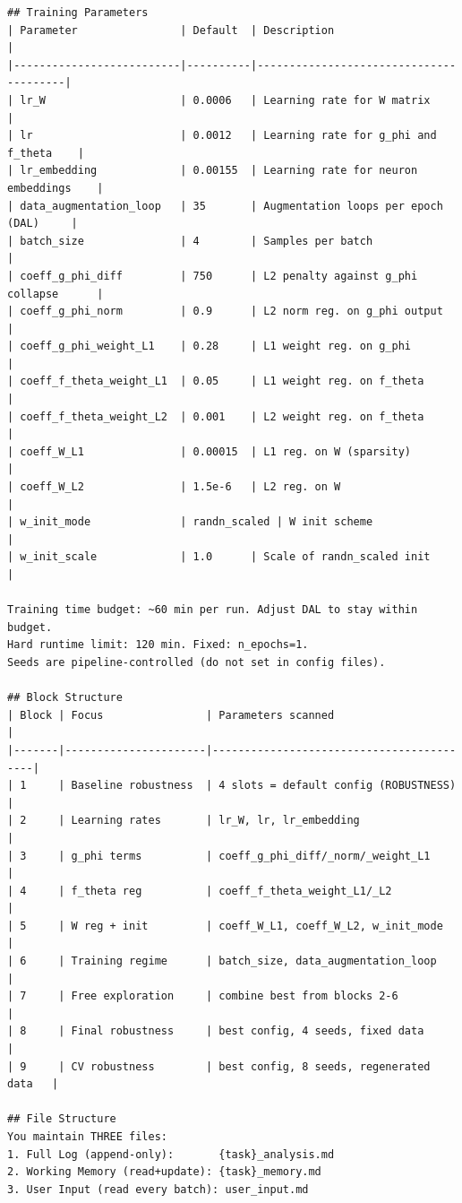 \documentclass{article}
\begin{document}
\begin{tiny}
\begin{verbatim}
## Training Parameters
| Parameter                | Default  | Description                            |
|--------------------------|----------|----------------------------------------|
| lr_W                     | 0.0006   | Learning rate for W matrix             |
| lr                       | 0.0012   | Learning rate for g_phi and f_theta    |
| lr_embedding             | 0.00155  | Learning rate for neuron embeddings    |
| data_augmentation_loop   | 35       | Augmentation loops per epoch (DAL)     |
| batch_size               | 4        | Samples per batch                      |
| coeff_g_phi_diff         | 750      | L2 penalty against g_phi collapse      |
| coeff_g_phi_norm         | 0.9      | L2 norm reg. on g_phi output           |
| coeff_g_phi_weight_L1    | 0.28     | L1 weight reg. on g_phi                |
| coeff_f_theta_weight_L1  | 0.05     | L1 weight reg. on f_theta              |
| coeff_f_theta_weight_L2  | 0.001    | L2 weight reg. on f_theta              |
| coeff_W_L1               | 0.00015  | L1 reg. on W (sparsity)                |
| coeff_W_L2               | 1.5e-6   | L2 reg. on W                           |
| w_init_mode              | randn_scaled | W init scheme                      |
| w_init_scale             | 1.0      | Scale of randn_scaled init             |

Training time budget: ~60 min per run. Adjust DAL to stay within budget.
Hard runtime limit: 120 min. Fixed: n_epochs=1.
Seeds are pipeline-controlled (do not set in config files).

## Block Structure
| Block | Focus                | Parameters scanned                       |
|-------|----------------------|------------------------------------------|
| 1     | Baseline robustness  | 4 slots = default config (ROBUSTNESS)    |
| 2     | Learning rates       | lr_W, lr, lr_embedding                   |
| 3     | g_phi terms          | coeff_g_phi_diff/_norm/_weight_L1        |
| 4     | f_theta reg          | coeff_f_theta_weight_L1/_L2              |
| 5     | W reg + init         | coeff_W_L1, coeff_W_L2, w_init_mode      |
| 6     | Training regime      | batch_size, data_augmentation_loop       |
| 7     | Free exploration     | combine best from blocks 2-6             |
| 8     | Final robustness     | best config, 4 seeds, fixed data         |
| 9     | CV robustness        | best config, 8 seeds, regenerated data   |

## File Structure
You maintain THREE files:
1. Full Log (append-only):       {task}_analysis.md
2. Working Memory (read+update): {task}_memory.md
3. User Input (read every batch): user_input.md


\end{verbatim}
\end{tiny}
\end{document}
